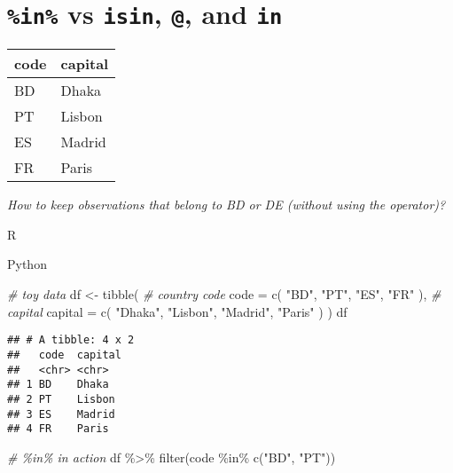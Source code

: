 \documentclass[
]{book}
\newenvironment{Shaded}{\begin{snugshade}}{\end{snugshade}}
\newcommand{\AttributeTok}[1]{\textcolor[rgb]{0.77,0.63,0.00}{#1}}
\newcommand{\CommentTok}[1]{\textcolor[rgb]{0.56,0.35,0.01}{\textit{#1}}}
\newcommand{\FunctionTok}[1]{\textcolor[rgb]{0.00,0.00,0.00}{#1}}
\newcommand{\NormalTok}[1]{#1}
\newcommand{\OtherTok}[1]{\textcolor[rgb]{0.56,0.35,0.01}{#1}}
\newcommand{\SpecialCharTok}[1]{\textcolor[rgb]{0.00,0.00,0.00}{#1}}
\newcommand{\StringTok}[1]{\textcolor[rgb]{0.31,0.60,0.02}{#1}}
\begin{document}
\hypertarget{in-vs-isin-and-in}{%
\section{\texorpdfstring{\texttt{\%in\%} vs \texttt{isin}, \texttt{@}, and \texttt{in}}{\%in\% vs isin, @, and in}}\label{in-vs-isin-and-in}}

\begin{longtable}[]{@{}ll@{}}
\toprule
code & capital \\
\midrule
\endhead
BD & Dhaka \\
PT & Lisbon \\
ES & Madrid \\
FR & Paris \\
\bottomrule
\end{longtable}

\emph{How to keep observations that belong to BD or DE (without using the \texttt{\textbar{}} operator)? }

R

Python

\begin{Shaded}
\begin{Highlighting}[]
\CommentTok{\# toy data}
\NormalTok{df }\OtherTok{\textless{}{-}} \FunctionTok{tibble}\NormalTok{(}
  \CommentTok{\# country code}
  \AttributeTok{code =} \FunctionTok{c}\NormalTok{(}
    \StringTok{"BD"}\NormalTok{, }\StringTok{"PT"}\NormalTok{,}
    \StringTok{"ES"}\NormalTok{, }\StringTok{"FR"}
\NormalTok{  ),}
  \CommentTok{\# capital}
  \AttributeTok{capital =} \FunctionTok{c}\NormalTok{(}
    \StringTok{"Dhaka"}\NormalTok{, }\StringTok{"Lisbon"}\NormalTok{,}
    \StringTok{"Madrid"}\NormalTok{, }\StringTok{"Paris"}
\NormalTok{  ) }
\NormalTok{)}
\NormalTok{df}
\end{Highlighting}
\end{Shaded}

\begin{verbatim}
## # A tibble: 4 x 2
##   code  capital
##   <chr> <chr>  
## 1 BD    Dhaka  
## 2 PT    Lisbon 
## 3 ES    Madrid 
## 4 FR    Paris
\end{verbatim}

\begin{Shaded}
\begin{Highlighting}[]
\CommentTok{\# \%in\% in action}
\NormalTok{df }\SpecialCharTok{\%\textgreater{}\%}
  \FunctionTok{filter}\NormalTok{(code }\SpecialCharTok{\%in\%} \FunctionTok{c}\NormalTok{(}\StringTok{"BD"}\NormalTok{, }\StringTok{"PT"}\NormalTok{))}
\end{Highlighting}
\end{Shaded}
\end{document}
